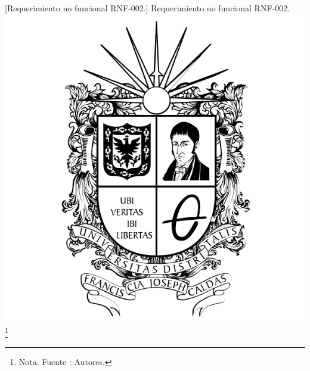 {\begin{enumerate}
        \vspace{2mm}
        \begin{minipage}{0.9\textwidth}
        \centering
        [{Requerimiento no funcional RNF-002.}]{ Requerimiento no funcional RNF-002. }
        \label{reqnf2}
        \includegraphics[width=1\textwidth]{Content/Images/Escudo_UD.png}
        \footnote{Nota. \textup{Fuente : Autores.}}
        \end{minipage}


\end{enumerate}}
